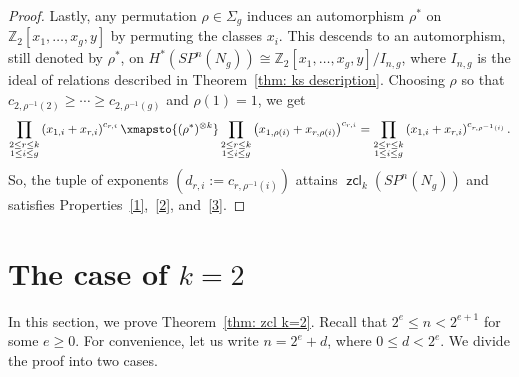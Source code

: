 \documentclass[amscd,amssymb,verbatim,10pt]{amsart}
\numberwithin{equation}{section}
\theoremstyle{plain}
\theoremstyle{definition}
\DeclareMathOperator{\zcl}{{\mathsf{zcl}}}
\def\Z{{\mathbb Z}}
\begin{document}
\begin{proof}
Lastly, any permutation $\rho\in\Sigma_g$ induces an automorphism $\rho^*$ on $\Z_2[x_1,\ldots,x_g,y]$ by permuting the classes $x_i$. This descends to an automorphism, still denoted by $\rho^*$, on $H^*(SP^n(N_g))\cong\Z_2[x_1,\ldots,x_g,y]/I_{n,g}$, where $I_{n,g}$ is the ideal of relations described in Theorem~\ref{thm: ks description}. Choosing $\rho$ so that $c_{2,\rho^{-1}(2)}\ge\cdots\ge c_{2,\rho^{-1}(g)}$ and $\rho(1)=1$, we get 
\[
\prod_{\substack{2\le r\le k \\ 1\le i \le g}}\left(x_{1,i}+x_{r,i}\right)^{c_{r,i}} \xmapsto{(\rho^*)^{\otimes k}} \prod_{\substack{2\le r\le k \\ 1\le i \le g}}\left(x_{1,\rho(i)}+x_{r,\rho(i)}\right)^{c_{r,i}}=\prod_{\substack{2\le r\le k \\ 1\le i \le g}}\left(x_{1,i}+x_{r,i}\right)^{c_{r,\rho^{-1}(i)}}.
\]
So, the tuple of exponents $(d_{r,i}:=c_{r,\rho^{-1}(i)})$ attains $\zcl_k(SP^n(N_g))$ and satisfies Properties~\eqref{1},~\eqref{2}, and~\eqref{3}.
\end{proof}

\section{The case of $k=2$}\label{sec: k=2}

In this section, we prove Theorem~\ref{thm: zcl k=2}.
Recall that $2^e\le n<2^{e+1}$ for some $e\ge 0$. For convenience, let us write $n=2^e+d$, where $0\le d<2^e$. We divide the proof into two cases.
\end{document}
